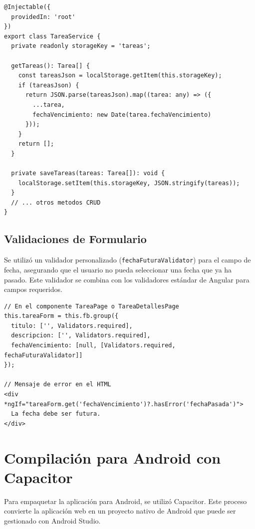 \documentclass{article}
\begin{document}
\begin{lstlisting}[breaklines=true]
@Injectable({
  providedIn: 'root'
})
export class TareaService {
  private readonly storageKey = 'tareas';

  getTareas(): Tarea[] {
    const tareasJson = localStorage.getItem(this.storageKey);
    if (tareasJson) {
      return JSON.parse(tareasJson).map((tarea: any) => ({
        ...tarea,
        fechaVencimiento: new Date(tarea.fechaVencimiento)
      }));
    }
    return [];
  }

  private saveTareas(tareas: Tarea[]): void {
    localStorage.setItem(this.storageKey, JSON.stringify(tareas));
  }
  // ... otros metodos CRUD
}
\end{lstlisting}

\subsection{Validaciones de Formulario}
Se utilizó un validador personalizado (\texttt{fechaFuturaValidator}) para el campo de fecha, asegurando que el usuario no pueda seleccionar una fecha que ya ha pasado. Este validador se combina con los validadores estándar de Angular para campos requeridos.

\begin{lstlisting}[breaklines=true]
// En el componente TareaPage o TareaDetallesPage
this.tareaForm = this.fb.group({
  titulo: ['', Validators.required],
  descripcion: ['', Validators.required],
  fechaVencimiento: [null, [Validators.required, fechaFuturaValidator]]
});

// Mensaje de error en el HTML
<div *ngIf="tareaForm.get('fechaVencimiento')?.hasError('fechaPasada')">
  La fecha debe ser futura.
</div>
\end{lstlisting}




\section{Compilación para Android con Capacitor}
Para empaquetar la aplicación para Android, se utilizó Capacitor. Este proceso convierte la aplicación web en un proyecto nativo de Android que puede ser gestionado con Android Studio.
\end{document}
